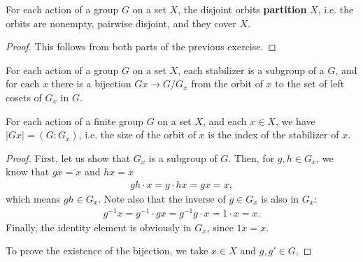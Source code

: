 \documentclass{../mathnotes}
\begin{document}
\begin{thm}
    For each action of a group $G$ on a set $X$, the disjoint orbits \textbf{partition} $X$, i.e. the orbits are nonempty, pairwise disjoint, and they cover $X$.
\end{thm}
\begin{proof}
    This follows from both parts of the previous exercise.
\end{proof}

\begin{thm}
    For each action of a group $G$ on a set $X$, each stabilizer is a subgroup of a $G$, and for each $x$ there is a bijection $Gx\to G/G_x$ from the orbit
    of $x$ to the set of left cosets of $G_x$ in $G$.
\end{thm}
\begin{cor}
    For each action of a finite group $G$ on a set $X$, and each $x\in X$, we have $|Gx|=(G:G_x)$, i.e. the size of the orbit of $x$ is the index of the stabilizer
    of $x$.
\end{cor}
\begin{proof}
    First, let us show that $G_x$ is a subgroup of $G$. Then, for $g,h\in G_x$, we know that $gx=x$ and $hx=x$
    \begin{align*}
        gh\cdot x=g\cdot hx=gx=x,
    \end{align*}
    which means $gh\in G_x$. Note also that the inverse of $g\in G_x$ is also in $G_x$:
    \begin{align*}
        g^{-1}x=g^{-1}\cdot gx=g^{-1}g\cdot x=1\cdot x=x.
    \end{align*}
    Finally, the identity element is obviously in $G_x$, since $1x=x$.

    To prove the existence of the bijection, we take $x\in X$ and $g,g'\in G$,
\end{proof}
\end{document}
